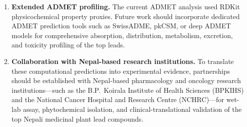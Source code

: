 \begin{enumerate}
    \item \textbf{Extended ADMET profiling.} The current ADMET analysis used RDKit
          physicochemical property proxies. Future work should incorporate dedicated
          ADMET prediction tools such as SwissADME, pkCSM, or deep ADMET models for
          comprehensive absorption, distribution, metabolism, excretion, and toxicity
          profiling of the top leads.

    \item \textbf{Collaboration with Nepal-based research institutions.} To translate
          these computational predictions into experimental evidence, partnerships should
          be established with Nepal-based pharmacology and oncology research institutions---such
          as the B.P.\ Koirala Institute of Health Sciences (BPKIHS) and the National
          Cancer Hospital and Research Centre (NCHRC)---for wet-lab assay, phytochemical
          isolation, and clinical-translational validation of the top Nepali medicinal
          plant lead compounds.
\end{enumerate}
